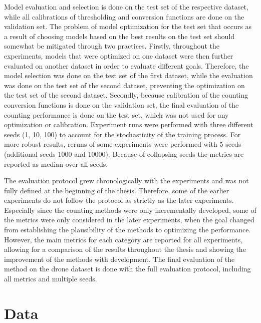 \documentclass[12pt,parskip = half, DIV=classic,listof=totoc]{scrartcl}
\begin{document}
			Model evaluation and selection is done on the test set of the respective dataset, while all calibrations of thresholding and conversion functions
			are done on the validation set. The problem of model optimization for the test set that occurs as a result of 
			choosing models based on the best results on the test set should somewhat be mitigated through two practices.
			Firstly, throughout the experiments, models that were optimized on one dataset were then further evaluated on another dataset in order to evaluate different goals. 
			Therefore, the model selection was done on the test set of the first dataset, while the evaluation was done on the test set of the second dataset, preventing 
			the optimization on the test set of the second dataset. Secondly, because calibration of the counting conversion functions is done on the validation set, 
			the final evaluation of the counting performance is done on the test set, which was not used for any optimization or calibration.
			Experiment runs were performed with three different seeds (1, 10, 100) to account for the stochasticity of the training process. 
			For more robust results, reruns of some experiments were performed with 5 seeds (additional seeds 1000 and 10000). 
			Because of collapsing seeds the metrics are reported as median over all seeds.

			The evaluation protocol grew chronologically with the experiments and was not fully defined at the beginning of the thesis. Therefore, some of the earlier experiments
			do not follow the protocol as strictly as the later experiments. Especially since the counting methods were only incrementally developed, some of the metrics
			were only considered in the later experiments, when the goal changed from establishing the plausibility of the methods to optimizing the performance.
			However, the main metrics for each category are reported for all experiments, allowing for a comparison of the results throughout the thesis and showing 
			the improvement of the methods with development. The final evaluation of the method on the drone dataset is done with the full evaluation protocol, 
			including all metrics and multiple seeds.

		\section{Data}\label{sec:4}
\end{document}
